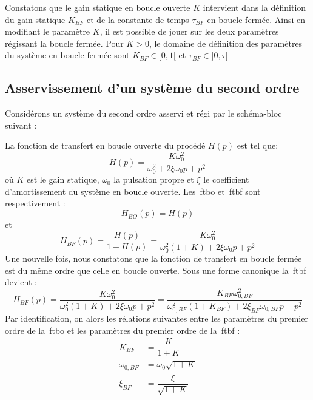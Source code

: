Constatons que le gain statique en boucle ouverte $K$ intervient 
dans la définition du gain statique $K_{BF}$ et de la constante de temps $\tau_{BF}$ en boucle fermée. 
Ainsi en modifiant le paramètre $K$, il est possible de jouer sur les deux paramètres régissant la boucle fermée.
Pour $K>0$, le domaine de définition des paramètres du système en boucle fermée sont  $K_{BF}\in[0,1[$ et  $\tau_{BF}\in]0,\tau]$

\subsection{Asservissement d'un système du second ordre}

Considérons un système du second ordre asservi et régi par le schéma-bloc suivant :
\begin{center}
\end{center}
La fonction de transfert en boucle ouverte du procédé $H(p)$ est tel que:
$$
H(p)=\dfrac{K\omega^2_0}{\omega^2_0+2\xi\omega_0p+p^2}
$$
où $K$ est le gain statique, $\omega_0$ la pulsation propre et $\xi$ 
le coefficient d'amortissement du système en boucle ouverte.
Les~\gls{ftbo} et~\gls{ftbf} sont respectivement :
$$
H_{BO}(p)=H(p)
$$
et 
$$
H_{BF}(p)=\dfrac{H(p)}{1+H(p)}=\dfrac{K\omega^2_0}{\omega^2_0(1+K)+2\xi\omega_0p+p^2}
$$
Une nouvelle fois, nous constatons que la fonction de transfert en boucle fermée est du même ordre
que celle en boucle ouverte. Sous une forme canonique la~\gls{ftbf} devient :
$$
H_{BF}(p)=\dfrac{K\omega^2_0}{\omega^2_0(1+K)+2\xi\omega_0p+p^2}=
\dfrac{K_{BF}\omega^2_{0,BF}}{\omega^2_{0,BF}(1+K_{BF})+2\xi_{BF}\omega_{0,BF}p+p^2}
$$
Par identification, on alors les rélations suivantes entre les paramètres du premier ordre 
de la~\gls{ftbo} et les paramètres du premier ordre de la~\gls{ftbf} :
\begin{align*}
       K_{BF}&=\dfrac{K}{1+K}\\
    \omega_{0,BF}&=\omega_0\sqrt{1+K}\\
    \xi_{BF}&=\dfrac{\xi}{\sqrt{1+K}}
\end{align*}

